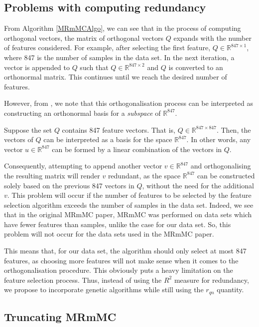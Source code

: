 \documentclass[12pt, twoside, a4paper]{report}
\begin{document}
\subsection{Problems with computing redundancy} \label{mrmmc_probs}

From Algorithm \ref{MRmMCAlgo}, we can see that in the process of computing orthogonal vectors, the matrix of orthogonal vectors $Q$ expands with the number of features considered. For example, after selecting the first feature, $Q \in \mathbb{R}^{847 \times 1}$, where 847 is the number of samples in the data set. In the next iteration, a vector is appended to $Q$ such that $Q \in \mathbb{R}^{847 \times 2}$ and $Q$ is converted to an orthonormal matrix. This continues until we reach the desired number of features.

However, from \cite{RefWorks:253}, we note that this orthogonalisation process can be interpreted as constructing an orthonormal basis for a \textit{subspace} of $\mathbb{R}^{847}$.

Suppose the set $Q$ contains 847 feature vectors. That is, $Q \in \mathbb{R}^{847 \times 847}$. Then, the vectors of $Q$ can be interpreted as a basis for the space $\mathbb{R}^{847}$. In other words, any vector $u \in \mathbb{R}^{847}$ can be formed by a linear combination of the vectors in $Q$.

Consequently, attempting to append another vector $v \in \mathbb{R}^{847}$ and orthogonalising the resulting matrix will render $v$ redundant, as the space $\mathbb{R}^{847}$ can be constructed solely based on the previous 847 vectors in $Q$, without the need for the additional $v$. This problem will occur if the number of features to be selected by the feature selection algorithm exceeds the number of samples in the data set. Indeed, we see that in the original MRmMC paper, MRmMC was performed on data sets which have fewer features than samples, unlike the case for our data set. So, this problem will not occur for the data sets used in the MRmMC paper.

This means that, for our data set, the algorithm should only select at most 847 features, as choosing more features will not make sense when it comes to the orthogonalisation procedure. This obviously puts a heavy limitation on the feature selection process. Thus, instead of using the $R^2$ measure for redundancy, we propose to incorporate genetic algorithms while still using the $r_{qn}$ quantity.

\subsection{Truncating MRmMC}
\end{document}
